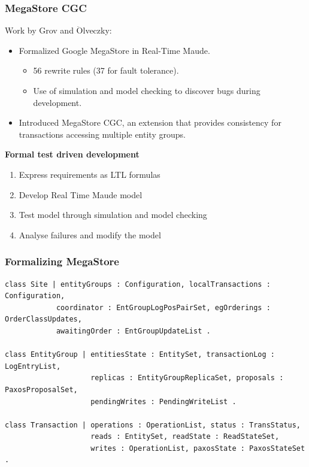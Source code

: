 \documentclass{beamer}
\begin{document}
\begin{frame}
    \frametitle{MegaStore CGC}
    \small
    Work by  Grov and $\ddot{\text{O}}$lveczky:
    \begin{itemize}
        \item Formalized Google MegaStore in Real-Time Maude.
        \begin{itemize}
            \item 56 rewrite rules (37 for fault tolerance).
            \item Use  of simulation and model checking to discover bugs during development.
        \end{itemize} 
        \item Introduced MegaStore CGC, an extension that provides consistency for transactions 
        accessing multiple entity groups. 
    \end{itemize} 
    
    \bigskip
    \begin{center}
    \textbf{Formal test driven development}
        \begin{enumerate}
            \item Express requirements as LTL formulas
            \item Develop Real Time Maude model 
            \item Test model through simulation and model checking 
            \item Analyse failures and modify the model
        \end{enumerate}
    \end{center}
\end{frame}
\begin{frame}[fragile]   

    \frametitle{Formalizing MegaStore} 
    \scriptsize   
    \begin{lstlisting}[language=maude]
class Site | entityGroups : Configuration, localTransactions : Configuration,
            coordinator : EntGroupLogPosPairSet, egOrderings : OrderClassUpdates,
            awaitingOrder : EntGroupUpdateList .

class EntityGroup | entitiesState : EntitySet, transactionLog : LogEntryList,
                    replicas : EntityGroupReplicaSet, proposals : PaxosProposalSet,
                    pendingWrites : PendingWriteList .

class Transaction | operations : OperationList, status : TransStatus,
                    reads : EntitySet, readState : ReadStateSet,
                    writes : OperationList, paxosState : PaxosStateSet .
    \end{lstlisting}
\end{frame}
\end{document}
